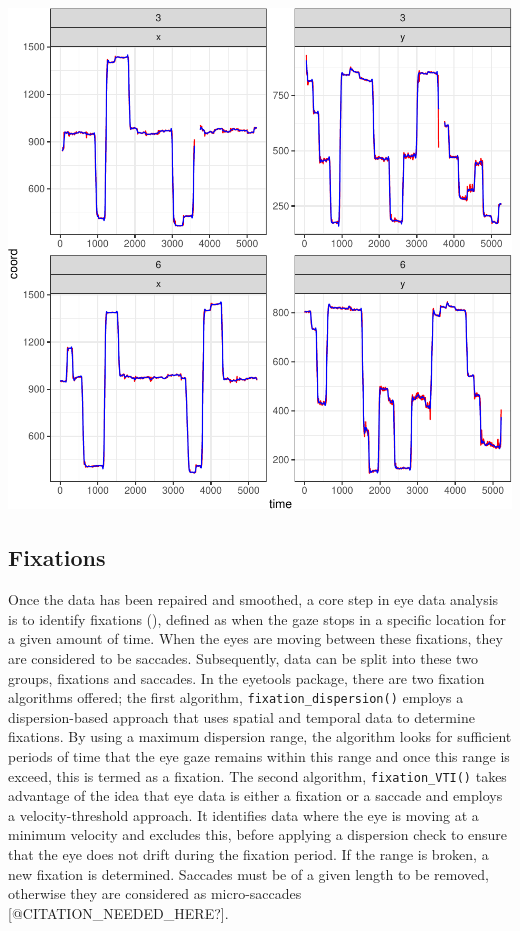 \documentclass[
  man,
  floatsintext,
  longtable,
  nolmodern,
  notxfonts,
  notimes,
  colorlinks=true,linkcolor=blue,citecolor=blue,urlcolor=blue]{apa7}
\begin{document}
\includegraphics{BRM_ms_files/figure-pdf/unnamed-chunk-6-1.pdf}

\subsection{Fixations}\label{fixations}

Once the data has been repaired and smoothed, a core step in eye data
analysis is to identify fixations
(),
defined as when the gaze stops in a specific location for a given amount
of time. When the eyes are moving between these fixations, they are
considered to be saccades. Subsequently, data can be split into these
two groups, fixations and saccades. In the eyetools package, there are
two fixation algorithms offered; the first algorithm,
\texttt{fixation\_dispersion()} employs a dispersion-based approach that
uses spatial and temporal data to determine fixations. By using a
maximum dispersion range, the algorithm looks for sufficient periods of
time that the eye gaze remains within this range and once this range is
exceed, this is termed as a fixation. The second algorithm,
\texttt{fixation\_VTI()} takes advantage of the idea that eye data is
either a fixation or a saccade and employs a velocity-threshold
approach. It identifies data where the eye is moving at a minimum
velocity and excludes this, before applying a dispersion check to ensure
that the eye does not drift during the fixation period. If the range is
broken, a new fixation is determined. Saccades must be of a given length
to be removed, otherwise they are considered as micro-saccades
{[}@CITATION\_NEEDED\_HERE?{]}.
\end{document}
